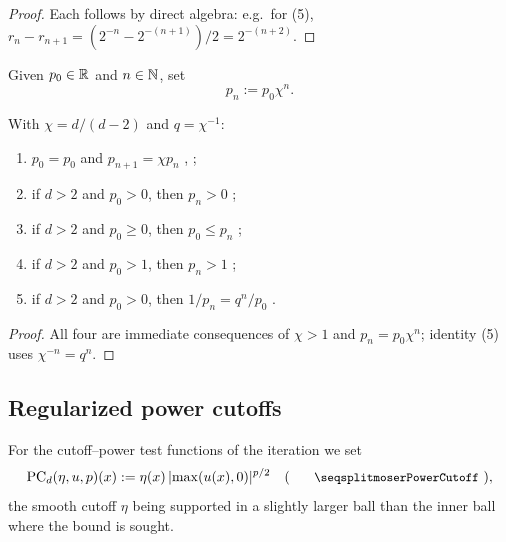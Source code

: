 \begin{proof}
\leanok

Each follows by direct algebra: e.g.\ for (5),
$r_n - r_{n+1} = (2^{-n} - 2^{-(n+1)})/2 = 2^{-(n+2)}$.
\end{proof}

\begin{definition}
\label{def:moserExponentSeq}
\leanok
{}
Given $p_0 \in \mathbb{R}$ and $n \in \mathbb{N}$, set
\begin{equation*}
  p_n := p_0 \chi^{n}.
\end{equation*}
\end{definition}

\begin{lemma}
\label{lem:moserExponentSeq_zero}
\leanok
{}
With $\chi = d/(d-2)$ and $q = \chi^{-1}$:
\begin{enumerate}
  \item $p_0 = p_0$ and $p_{n+1} = \chi p_n$ , ;
  \item if $d>2$ and $p_0 > 0$, then $p_n > 0$ ;
  \item if $d>2$ and $p_0 \geq 0$, then $p_0 \leq p_n$ ;
  \item if $d>2$ and $p_0 > 1$, then $p_n > 1$ ;
  \item if $d>2$ and $p_0 > 0$, then $1/p_n = q^n / p_0$ .
\end{enumerate}
\end{lemma}

\begin{proof}
\leanok
{}

All four are immediate consequences of $\chi > 1$ and $p_n = p_0 \chi^n$;
identity (5) uses $\chi^{-n} = q^n$.
\end{proof}

\subsection{Regularized power cutoffs}

For the cutoff--power test functions of the iteration we set
\begin{equation*}
  \mathrm{PC}_d(\eta,u,p)(x) := \eta(x)\,|\!\max(u(x),0)|^{p/2}
  \quad (\text{\leanname{moserPowerCutoff}}),
\end{equation*}
the smooth cutoff $\eta$ being supported in a slightly larger ball than the
inner ball where the bound is sought.

